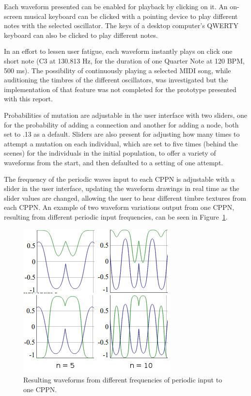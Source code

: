\documentclass[conference]{IEEEtran}
\begin{document}
Each waveform presented can be enabled for playback by clicking on it.  An on-screen musical keyboard can be clicked with a pointing device to play different notes with the selected oscillator.  The keys of a desktop computer's QWERTY keyboard can also be clicked to play different notes.

In an effort to lessen user fatigue, each waveform instantly plays on click one short note (C3 at 130.813 Hz, for the duration of one Quarter Note at 120 BPM, 500 ms).  The possibility of continuously playing a selected MIDI song, while auditioning the timbres of the different oscillators, was investigated but the implementation of that feature was not completed for the prototype presented with this report.

Probabilities of mutation are adjustable in the user interface with two sliders, one for the probability of adding a connection and another for adding a node, both set to .13 as a default.  Sliders are also present for adjusting how many times to attempt a mutation on each individual, which are set to five times (behind the scenes) for the individuals in the initial population, to offer a variety of waveforms from the start, and then defaulted to a setting of one attempt.

The frequency of the periodic waves input to each CPPN is adjustable with a slider in the user interface, updating the waveform drawings in real time as the slider values are changed, allowing the user to hear different timbre textures from each CPPN.  An example of two waveform variations output from one CPPN, resulting from different periodic input frequencies, can be seen in Figure~\ref{fig:inputFrequencies}.

\begin{figure}[htp]
	\centerline{\includegraphics[width=.8\columnwidth]{inputFrequencies.png}}
	\caption{Resulting waveforms from different frequencies of periodic input to one CPPN.}
	\label{fig:inputFrequencies}
\end{figure}
\end{document}

